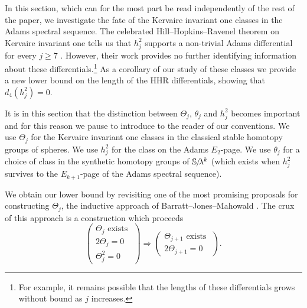 
In this section, which can for the most part be read independently of the rest of the paper, we investigate the fate of the Kervaire invariant one classes in the Adams spectral sequence.
The celebrated Hill--Hopkins--Ravenel theorem on Kervaire invariant one tells us that $h_j^2$ supports a non-trivial Adams differential for every $j \geq 7$ \cite{HHR}. However, their work provides no further identifying information about these differentials.\footnote{For example, it remains possible that the lengths of these differentials grows without bound as $j$ increases.}
As a corollary of our study of these classes we provide a new lower bound on the length of the HHR differentials, showing that $ d_4(h_j^2) = 0 $.

It is in this section that the distinction between $\Theta_j$, $\theta_j$ and $h_j^2$ becomes important and for this reason we pause to introduce to the reader of our conventions.
  We use $\Theta_j$ for the Kervaire invariant one classes in the classical stable homotopy groups of spheres.
  We use $h_j^2$ for the class on the Adams $E_2$-page.
  We use $\theta_j$ for a choice of class in the synthetic homotopy groups of $\operatorname{\mathbb{S}}\hspace{-2.2pt}/\!\lambda^k$ (which exists when $h_j^2$ survives to the $E_{k+1}$-page of the Adams spectral sequence).

We obtain our lower bound by revisiting one of the most promising proposals for constructing $\Theta_j$, the inductive approach of Barratt--Jones--Mahowald \cite{Inductive}. %
The crux of this approach is a construction which proceeds
\[ \begin{pmatrix} \Theta_j \text{ exists } \\ 2\Theta_j  = 0 \\ \Theta_j^2 = 0 \end{pmatrix} \Longrightarrow \begin{pmatrix} \Theta_{j+1} \text{ exists } \\ 2\Theta_{j+1} = 0 \end{pmatrix}. \]


